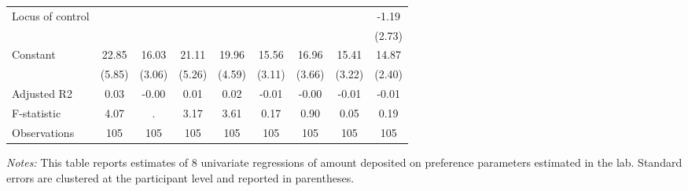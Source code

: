 \begin{table}[ht]
{\begin{threeparttable}
\begin{tabular}{l*{8}{c}}
Locus of control&         &         &         &         &         &         &         &    -1.19\\
                &         &         &         &         &         &         &         &   (2.73)\\
Constant        &    22.85&    16.03&    21.11&    19.96&    15.56&    16.96&    15.41&    14.87\\
                &   (5.85)&   (3.06)&   (5.26)&   (4.59)&   (3.11)&   (3.66)&   (3.22)&   (2.40)\\
\midrule
Adjusted R2     &     0.03&    -0.00&     0.01&     0.02&    -0.01&    -0.00&    -0.01&    -0.01\\
F-statistic     &     4.07&        .&     3.17&     3.61&     0.17&     0.90&     0.05&     0.19\\
Observations    &      105&      105&      105&      105&      105&      105&      105&      105\\
\bottomrule \end{tabular} \begin{tablenotes}[flushleft] \footnotesize \item \emph{Notes:} This table reports estimates of 8 univariate regressions of amount deposited on preference parameters estimated in the lab. Standard errors are clustered at the participant level and reported in parentheses. \end{tablenotes} \end{threeparttable} } \end{table}
